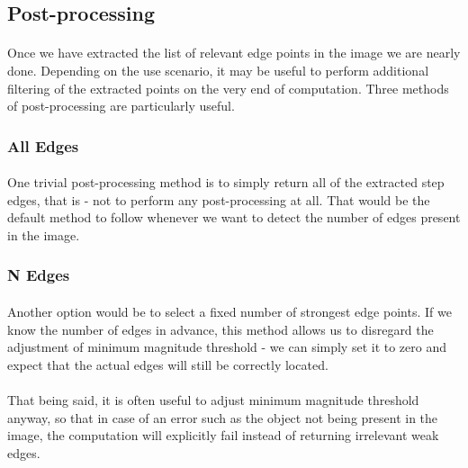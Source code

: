 \subsection{Post-processing}

\paragraph*{}
Once we have extracted the list of relevant edge points in the image we are nearly done. Depending on the use scenario, it may be useful to perform additional filtering of the extracted points on the very end of computation. Three methods of post-processing are particularly useful.

\subsubsection{All Edges}
\paragraph*{}
One trivial post-processing method is to simply return all of the extracted step edges, that is - not to perform any post-processing at all. That would be the default method to follow whenever we want to detect the number of edges present in the image.

\subsubsection{N Edges}
\paragraph*{}
Another option would be to select a fixed number of strongest edge points. If we know the number of edges in advance, this method allows us to disregard the adjustment of minimum magnitude threshold - we can simply set it to zero and expect that the actual edges will still be correctly located. 

\paragraph*{}
That being said, it is often useful to adjust minimum magnitude threshold anyway, so that in case of an error such as the object not being present in the image, the computation will explicitly fail instead of returning irrelevant weak edges. 

